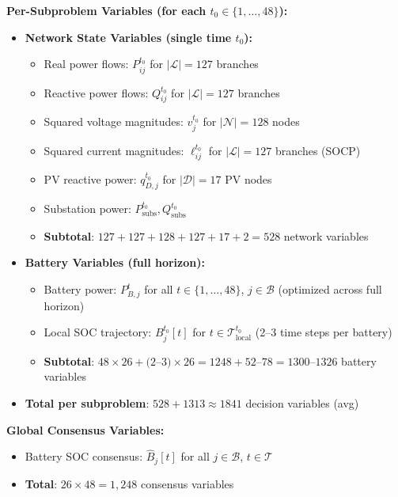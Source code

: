 \documentclass[11pt]{article}
\begin{document}
\textbf{Per-Subproblem Variables (for each $t_0 \in \{1, \ldots, 48\}$):}
\begin{itemize}
    \item \textbf{Network State Variables (single time $t_0$):}
    \begin{itemize}
        \item Real power flows: $P_{ij}^{t_0}$ for $|\mathcal{L}| = 127$ branches
        \item Reactive power flows: $Q_{ij}^{t_0}$ for $|\mathcal{L}| = 127$ branches
        \item Squared voltage magnitudes: $v_j^{t_0}$ for $|\mathcal{N}| = 128$ nodes
        \item Squared current magnitudes: $\ell_{ij}^{t_0}$ for $|\mathcal{L}| = 127$ branches (SOCP)
        \item PV reactive power: $q_{D,j}^{t_0}$ for $|\mathcal{D}| = 17$ PV nodes
        \item Substation power: $P_{\text{subs}}^{t_0}, Q_{\text{subs}}^{t_0}$
        \item \textbf{Subtotal}: $127 + 127 + 128 + 127 + 17 + 2 = 528$ network variables
    \end{itemize}
    \item \textbf{Battery Variables (full horizon):}
    \begin{itemize}
        \item Battery power: $P_{B,j}^{t}$ for all $t \in \{1, \ldots, 48\}$, $j \in \mathcal{B}$ (optimized across full horizon)
        \item Local SOC trajectory: $B_j^{t_0}[t]$ for $t \in \mathcal{T}_{\text{local}}^{t_0}$ (2--3 time steps per battery)
        \item \textbf{Subtotal}: $48 \times 26 + (2$--$3) \times 26 = 1248 + 52$--$78 = 1300$--$1326$ battery variables
    \end{itemize}
    \item \textbf{Total per subproblem}: $528 + 1313 \approx 1841$ decision variables (avg)
\end{itemize}

\textbf{Global Consensus Variables:}
\begin{itemize}
    \item Battery SOC consensus: $\hat{B}_j[t]$ for all $j \in \mathcal{B}$, $t \in \mathcal{T}$
    \item \textbf{Total}: $26 \times 48 = 1,248$ consensus variables
\end{itemize}
\end{document}
